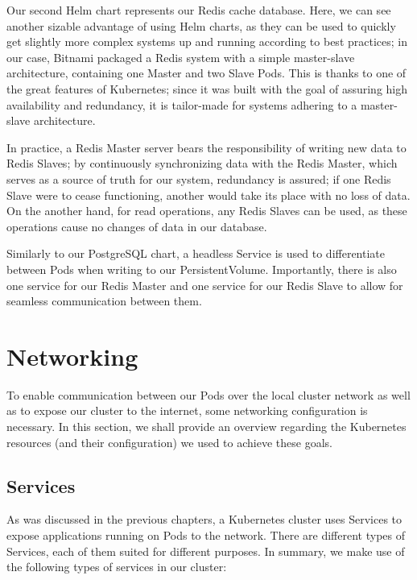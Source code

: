 \documentclass[thesis=B,english]{FITthesis}[2019/12/23]
\begin{document}
Our second Helm chart represents our Redis cache database. Here, we can see another sizable advantage of using Helm charts, as they can be used to quickly get slightly more complex systems up and running according to best practices; in our case, Bitnami packaged a Redis system with a simple master-slave architecture, containing one Master and two Slave Pods. This is thanks to one of the great features of Kubernetes; since it was built with the goal of assuring high availability and redundancy, it is tailor-made for systems adhering to a master-slave architecture.

In practice, a Redis Master server bears the responsibility of writing new data to Redis Slaves; by continuously synchronizing data with the Redis Master, which serves as a source of truth for our system, redundancy is assured; if one Redis Slave were to cease functioning, another would take its place with no loss of data. On the another hand, for read operations, any Redis Slaves can be used, as these operations cause no changes of data in our database. \cite{redis}

Similarly to our PostgreSQL chart, a headless Service is used to differentiate between Pods when writing to our PersistentVolume. Importantly, there is also one service for our Redis Master and one service for our Redis Slave to allow for seamless communication between them.

\newpage

\section{Networking}

To enable communication between our Pods over the local cluster network as well as to expose our cluster to the internet, some networking configuration is necessary. In this section, we shall provide an overview regarding the Kubernetes resources (and their configuration) we used to achieve these goals.

\subsection{Services}

As was discussed in the previous chapters, a Kubernetes cluster uses Services to expose applications running on Pods to the network. There are different types of Services, each of them suited for different purposes. In summary, we make use of the following types of services in our cluster:
\end{document}
